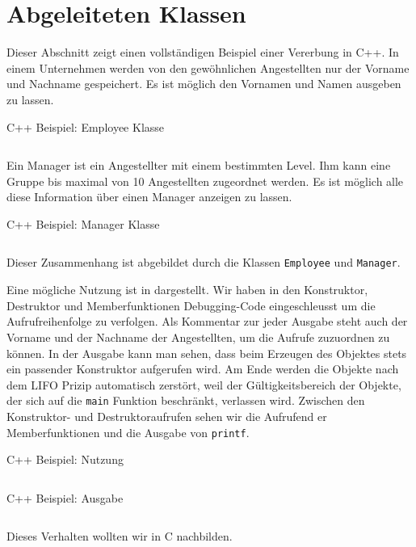 \section{Abgeleiteten Klassen}
Dieser Abschnitt zeigt einen vollständigen Beispiel einer Vererbung in C++.
In einem Unternehmen werden von den gewöhnlichen Angestellten nur der Vorname und Nachname gespeichert.
Es ist möglich den Vornamen und Namen ausgeben zu lassen.

\begin{code}
	\caption{C++ Beispiel: Employee Klasse}
	\label{code:virtcpp:employee}
	\inputminted{cpp}{code/employees_virt_cpp/employee.hpp}
\end{code}

Ein Manager ist ein Angestellter mit einem bestimmten Level.
Ihm kann eine Gruppe bis maximal von 10 Angestellten zugeordnet werden.
Es ist möglich alle diese Information über einen Manager anzeigen zu lassen.

\begin{code}
	\caption{C++ Beispiel: Manager Klasse}
	\label{code:virtcpp:manager}
	\inputminted{cpp}{code/employees_virt_cpp/manager.hpp}
\end{code}

Dieser Zusammenhang ist abgebildet durch die Klassen \texttt{Employee} und \texttt{Manager}.


Eine mögliche Nutzung ist in  dargestellt.
Wir haben in den Konstruktor, Destruktor und Memberfunktionen Debugging-Code eingeschleusst um die Aufrufreihenfolge zu verfolgen.
Als Kommentar zur jeder Ausgabe steht auch der Vorname und der Nachname der Angestellten, um die Aufrufe zuzuordnen zu können.
In der Ausgabe kann man sehen, dass beim Erzeugen des Objektes stets ein passender Konstruktor aufgerufen wird.
Am Ende werden die Objekte nach dem LIFO Prizip automatisch zerstört, weil der Gültigkeitsbereich der Objekte, der sich auf die \texttt{main} Funktion beschränkt, verlassen wird.
Zwischen den Konstruktor- und Destruktoraufrufen sehen wir die Aufrufend er Memberfunktionen und die Ausgabe von \texttt{printf}.

\begin{code}
	\caption{C++ Beispiel: Nutzung}
	\label{code:virtcpp:usage}
	\inputminted{cpp}{code/employees_virt_cpp/main.cpp}
\end{code}

\begin{code}
	\caption{C++ Beispiel: Ausgabe}
	\label{code:virtcpp:output}
	\inputminted[bgcolor=white]{text}{code/employees_virt_cpp/output.txt}
\end{code}

Dieses Verhalten wollten wir in C nachbilden.
